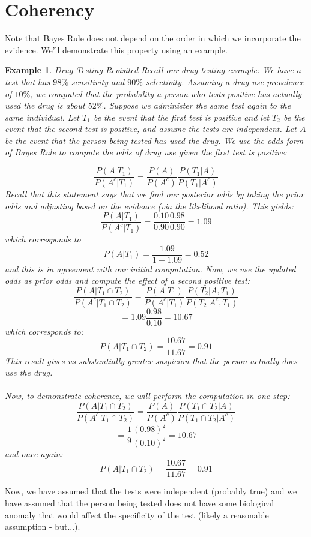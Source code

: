 \documentclass[12pt]{article} %
\newtheorem{example}{Example}
\begin{document}
\section{Coherency}
Note that Bayes Rule does not depend on the order in which we incorporate the evidence. We'll demonstrate this property using an example.
\begin{example}{Drug Testing Revisited}
Recall our drug testing example: We have a test that has $98\%$ sensitivity and $90\%$ selectivity. Assuming a drug use prevalence of $10\%$, we computed that the probability a person who tests positive has actually used the drug is about $52\%$. Suppose we administer the same test again to the same individual. Let $T_1$ be the event that the first test is positive and let $T_2$ be the event that the second test is positive, and assume the tests are independent. Let $A$ be the event that the person being tested has used the drug. We use the \emph{odds form} of Bayes Rule to compute the odds of drug use given the first test is positive:

$$\frac{P(A|T_1)}{P(A^c|T_1)} = \frac{P(A)}{P(A^c)}\frac{P(T_1|A)}{P(T_1|A^c)}$$
Recall that this statement says that we find our posterior odds by taking the prior odds and adjusting based on the evidence (via the likelihood ratio). This yields:
$$\frac{P(A|T_1)}{P(A^c|T_1)} = \frac{0.10}{0.90}\frac{0.98}{0.90} = 1.09$$
which corresponds to 
$$P(A|T_1) = \frac{1.09}{1+1.09} = 0.52$$
and this is in agreement with our initial computation. Now, we use the updated odds as prior odds and compute the effect of a second positive test:
$$\frac{P(A|T_1\cap T_2)}{P(A^c|T_1\cap T_2)}= \frac{P(A|T_1)}{P(A^c|T_1)}\frac{P(T_2|A,T_1)}{P(T_2|A^c,T_1)}$$
$$ = 1.09\frac{0.98}{0.10} = 10.67$$
which corresponds to:
$$P(A|T_1\cap T_2) = \frac{10.67}{11.67} = 0.91$$
This result gives us substantially greater suspicion that the person actually does use the drug.\\\\
Now, to demonstrate coherence, we will perform the computation in one step:
$$\frac{P(A|T_1\cap T_2)}{P(A^c|T_1\cap T_2)}= \frac{P(A)}{P(A^c)}\frac{P(T_1\cap T_2|A)}{P(T_1\cap T_2|A^c)}$$
$$= \frac19\frac{(0.98)^2}{(0.10)^2} = 10.67$$
and once again:
$$P(A|T_1\cap T_2) = \frac{10.67}{11.67} = 0.91$$
\end{example}
Now, we have assumed that the tests were independent (probably true) and we have assumed that the person being tested does not have some biological anomaly that would affect the specificity of the test (likely a reasonable assumption - but...).
\end{document}

